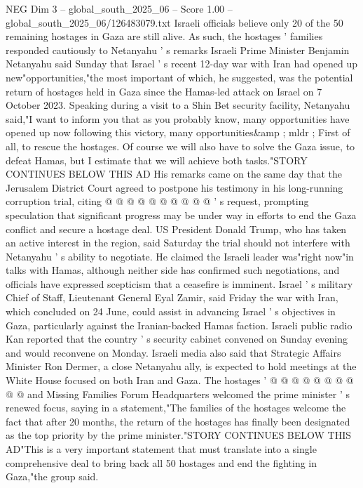 \begin{textsample}{NEG Dim 3 – global\_south\_2025\_06 – Score 1.00 – global\_south\_2025\_06/126483079.txt}  \label{ex:f3_neg_252}
Israeli officials believe only 20 of the 50 remaining hostages in Gaza are still alive.
As such, the hostages ' families responded cautiously to Netanyahu ' s remarks Israeli Prime Minister Benjamin Netanyahu said Sunday that Israel ' s recent 12-day war with Iran had opened up new"opportunities,"the most important of which, he suggested, was the potential return of hostages held in Gaza since the Hamas-led attack on Israel on 7 October 2023.
Speaking during a visit to a Shin Bet security facility, Netanyahu said,"I want to inform you that as you probably know, many opportunities have opened up now following this victory, many opportunities\&amp ; mldr ; First of all, to rescue the hostages.
Of course we will also have to solve the Gaza issue, to defeat Hamas, but I estimate that we will achieve both tasks."STORY CONTINUES BELOW THIS AD His remarks came on the same day that the Jerusalem District Court agreed to postpone his testimony in his long-running corruption trial, citing @ @ @ @ @ @ @ @ @ @ ' s request, prompting speculation that significant progress may be under way in efforts to end the Gaza conflict and secure a hostage deal.
US President Donald Trump, who has taken an active interest in the region, said Saturday the trial should not interfere with Netanyahu ' s ability to negotiate.
He claimed the Israeli leader was"right now"in talks with Hamas, although neither side has confirmed such negotiations, and officials have expressed scepticism that a ceasefire is imminent.
Israel ' s military Chief of Staff, Lieutenant General Eyal Zamir, said Friday the war with Iran, which concluded on 24 June, could assist in advancing Israel ' s objectives in Gaza, particularly against the Iranian-backed Hamas faction.
Israeli public radio Kan reported that the country ' s security cabinet convened on Sunday evening and would reconvene on Monday.
Israeli media also said that Strategic Affairs Minister Ron Dermer, a close Netanyahu ally, is expected to hold meetings at the White House focused on both Iran and Gaza.
The hostages ' @ @ @ @ @ @ @ @ @ @ and Missing Families Forum Headquarters welcomed the prime minister ' s renewed focus, saying in a statement,"The families of the hostages welcome the fact that after 20 months, the return of the hostages has finally been designated as the top priority by the prime minister."STORY CONTINUES BELOW THIS AD"This is a very important statement that must translate into a single comprehensive deal to bring back all 50 hostages and end the fighting in Gaza,"the group said.

\end{textsample}
